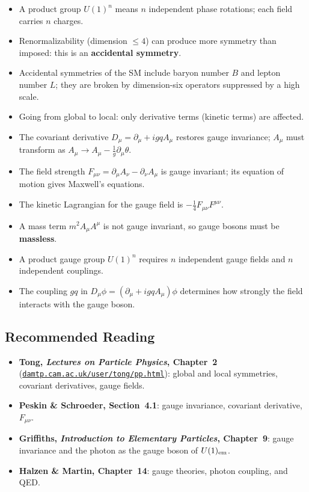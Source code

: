 \documentclass[../main.tex]{subfiles}
\begin{document}
\begin{itemize}
  \item A product group $U(1)^n$ means $n$ independent phase rotations; each field carries $n$ charges.
  \item Renormalizability (dimension $\leq4$) can produce more symmetry than imposed: this is an \textbf{accidental symmetry}.
  \item Accidental symmetries of the SM include baryon number $B$ and lepton number $L$; they are broken by dimension-six operators suppressed by a high scale.
  \item Going from global to local: only derivative terms (kinetic terms) are affected.
  \item The covariant derivative $D_\mu = \partial_\mu + igqA_\mu$ restores gauge invariance; $A_\mu$ must transform as $A_\mu\to A_\mu - \frac{1}{g}\partial_\mu\theta$.
  \item The field strength $F_{\mu\nu}=\partial_\mu A_\nu-\partial_\nu A_\mu$ is gauge invariant; its equation of motion gives Maxwell's equations.
  \item The kinetic Lagrangian for the gauge field is $-\frac{1}{4}F_{\mu\nu}F^{\mu\nu}$.
  \item A mass term $m^2 A_\mu A^\mu$ is not gauge invariant, so gauge bosons must be \textbf{massless}.
  \item A product gauge group $U(1)^n$ requires $n$ independent gauge fields and $n$ independent couplings.
  \item The coupling $gq$ in $D_\mu\phi = (\partial_\mu + igqA_\mu)\phi$ determines how strongly the field interacts with the gauge boson.
\end{itemize}

\subsection*{Recommended Reading}

\begin{itemize}
  \item \textbf{Tong, \textit{Lectures on Particle Physics}, Chapter~2}
    (\href{https://www.damtp.cam.ac.uk/user/tong/pp.html}{\texttt{damtp.cam.ac.uk/user/tong/pp.html}}):
    global and local symmetries, covariant derivatives, gauge fields.
  \item \textbf{Peskin \& Schroeder, Section~4.1}: gauge invariance, covariant derivative, $F_{\mu\nu}$.
  \item \textbf{Griffiths, \textit{Introduction to Elementary Particles}, Chapter~9}: gauge invariance and the photon as the gauge boson of $U(1)_{\rm em}$.
  \item \textbf{Halzen \& Martin, Chapter~14}: gauge theories, photon coupling, and QED.
\end{itemize}
\end{document}
